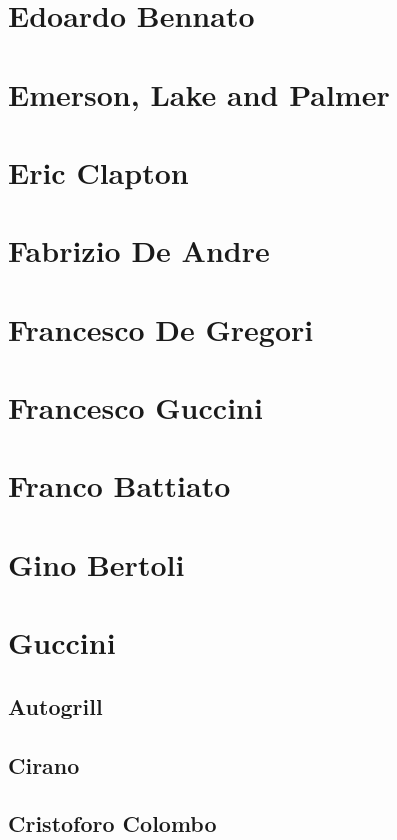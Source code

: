 \chapter{Edoardo Bennato}

\chapter{Emerson, Lake and Palmer}

\chapter{Eric Clapton}

\chapter{Fabrizio De Andre}

\chapter{Francesco De Gregori}

\chapter{Francesco Guccini}

\chapter{Franco Battiato}

\chapter{Gino Bertoli}

\chapter{Guccini}
\section{Autogrill}
\section{Cirano}
\section{Cristoforo Colombo}
